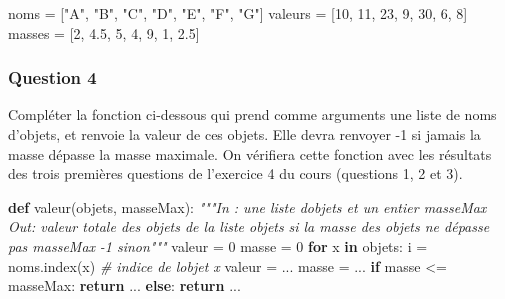 \documentclass[
  paper=a4,
  ,captions=tableheading
]{scrartcl}
\newenvironment{Shaded}{}{}
\newcommand{\CommentTok}[1]{\textcolor[rgb]{0.38,0.63,0.69}{\textit{#1}}}
\newcommand{\ControlFlowTok}[1]{\textcolor[rgb]{0.00,0.44,0.13}{\textbf{#1}}}
\newcommand{\DecValTok}[1]{\textcolor[rgb]{0.25,0.63,0.44}{#1}}
\newcommand{\FloatTok}[1]{\textcolor[rgb]{0.25,0.63,0.44}{#1}}
\newcommand{\KeywordTok}[1]{\textcolor[rgb]{0.00,0.44,0.13}{\textbf{#1}}}
\newcommand{\NormalTok}[1]{#1}
\newcommand{\OperatorTok}[1]{\textcolor[rgb]{0.40,0.40,0.40}{#1}}
\newcommand{\StringTok}[1]{\textcolor[rgb]{0.25,0.44,0.63}{#1}}
\begin{document}
\begin{Shaded}
\begin{Highlighting}[]
\NormalTok{noms }\OperatorTok{=}\NormalTok{ [}\StringTok{"A"}\NormalTok{, }\StringTok{"B"}\NormalTok{, }\StringTok{"C"}\NormalTok{, }\StringTok{"D"}\NormalTok{, }\StringTok{"E"}\NormalTok{, }\StringTok{"F"}\NormalTok{, }\StringTok{"G"}\NormalTok{]}
\NormalTok{valeurs }\OperatorTok{=}\NormalTok{ [}\DecValTok{10}\NormalTok{, }\DecValTok{11}\NormalTok{, }\DecValTok{23}\NormalTok{, }\DecValTok{9}\NormalTok{, }\DecValTok{30}\NormalTok{, }\DecValTok{6}\NormalTok{, }\DecValTok{8}\NormalTok{]}
\NormalTok{masses }\OperatorTok{=}\NormalTok{ [}\DecValTok{2}\NormalTok{, }\FloatTok{4.5}\NormalTok{, }\DecValTok{5}\NormalTok{, }\DecValTok{4}\NormalTok{, }\DecValTok{9}\NormalTok{, }\DecValTok{1}\NormalTok{, }\FloatTok{2.5}\NormalTok{]}
\end{Highlighting}
\end{Shaded}

\hypertarget{question-4}{%
\subsubsection{Question 4}\label{question-4}}

Compléter la fonction ci-dessous qui prend comme arguments une liste de
noms d'objets, et renvoie la valeur de ces objets. Elle devra renvoyer
-1 si jamais la masse dépasse la masse maximale. On vérifiera cette
fonction avec les résultats des trois premières questions de l'exercice
4 du cours (questions 1, 2 et 3).

\begin{Shaded}
\begin{Highlighting}[]
\KeywordTok{def}\NormalTok{ valeur(objets, masseMax):}
    \CommentTok{"""In : une liste d\textquotesingle{}objets et un entier masseMax}
\CommentTok{    Out: valeur totale des objets de la liste objets}
\CommentTok{         si la masse des objets ne dépasse pas masseMax}
\CommentTok{         {-}1 sinon"""}
\NormalTok{    valeur }\OperatorTok{=} \DecValTok{0}
\NormalTok{    masse }\OperatorTok{=} \DecValTok{0}
    \ControlFlowTok{for}\NormalTok{ x }\KeywordTok{in}\NormalTok{ objets:}
\NormalTok{        i }\OperatorTok{=}\NormalTok{ noms.index(x)  }\CommentTok{\# indice de l\textquotesingle{}objet x}
\NormalTok{        valeur }\OperatorTok{=}\NormalTok{ ...}
\NormalTok{        masse }\OperatorTok{=}\NormalTok{ ...}
    \ControlFlowTok{if}\NormalTok{ masse }\OperatorTok{\textless{}=}\NormalTok{ masseMax:}
        \ControlFlowTok{return}\NormalTok{ ...}
    \ControlFlowTok{else}\NormalTok{:}
        \ControlFlowTok{return}\NormalTok{ ...}
\end{Highlighting}
\end{Shaded}
\end{document}
